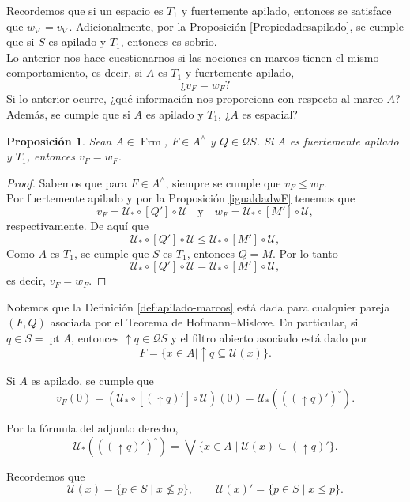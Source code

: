 \documentclass[11pt]{amsart}
\DeclareMathOperator{\pt}{pt}
\DeclareMathOperator{\Frm}{Frm}
\theoremstyle{plain}
\newtheorem{prop}[thm]{Proposición}
\theoremstyle{definition}
\begin{document}
Recordemos que si un espacio es $T_1$ y fuertemente apilado, entonces se satisface que $w_\nabla=v_\nabla$. Adicionalmente, por la Proposición \ref{Propiedadesapilado}, se cumple que
si $S$ es apilado y $T_1$, entonces es sobrio.\\

Lo anterior nos hace cuestionarnos si las nociones en marcos tienen el mismo comportamiento, es decir, si $A$ es $T_1$ y fuertemente apilado, 
\[
\text{¿}v_F=w_F?
\]
Si lo anterior ocurre, ¿qué información nos proporciona con respecto al marco $A$? Además, se cumple que si $A$ es 
apilado y $T_1$, ¿$A$ es espacial?

\begin{prop}\label{v_F=w_F}
Sean $A\in \Frm$, $F\in A^\wedge$ y $Q\in \mathcal{Q}S$. Si $A$ es fuertemente apilado y $T_1$, entonces $v_F=w_F$. 
\end{prop}

\begin{proof}
Sabemos que para $F\in A^\wedge$, siempre se cumple que $v_F\leq w_F$.\\

Por fuertemente apilado y por la Proposición \ref{igualdadwF} tenemos que
\[
v_F=\mathcal{U}_*\circ [Q']\circ \mathcal{U}\quad \text{y}\quad w_F=\mathcal{U}_*\circ[M']\circ \mathcal{U},
\]
respectivamente. De aquí que
\[
\mathcal{U}_*\circ [Q']\circ \mathcal{U}\leq\mathcal{U}_*\circ[M']\circ \mathcal{U},
\]
Como $A$ es $T_1$, se cumple que $S$ es $T_1$, entonces $Q=M$. Por lo tanto
\[
\mathcal{U}_*\circ [Q']\circ \mathcal{U}=\mathcal{U}_*\circ[M']\circ \mathcal{U},
\]
es decir, $v_F=w_F$.
\end{proof}

Notemos que la Definición \ref{def:apilado-marcos} está dada para cualquier pareja $(F,Q)$
asociada por el Teorema de Hofmann--Mislove. En particular, si $q\in S=\pt A$, entonces
$\uparrow q\in \mathcal{Q}S$ y el filtro abierto asociado está dado por
\[
F=\{x\in A\mid \uparrow q\subseteq \mathcal{U}(x)\}.
\]

Si $A$ es apilado, se cumple que
\[
v_F(0)=(\mathcal{U}_*\circ[(\uparrow q)']\circ \mathcal{U})(0)
=\mathcal{U}_*(((\uparrow q)')^\circ).
\]

Por la fórmula del adjunto derecho,
\[
\mathcal{U}_*(((\uparrow q)')^\circ)
=\bigvee\{x\in A\mid \mathcal{U}(x)\subseteq (\uparrow q)'\}.
\]

Recordemos que
\[
\mathcal{U}(x)=\{p\in S\mid x\nleq p\},
\qquad
\mathcal{U}(x)'=\{p\in S\mid x\leq p\}.
\]
\end{document}

